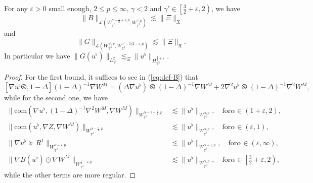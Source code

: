 \begin{lem}
  For any $\varepsilon > 0$ small enough, $2 \leqslant p \leqslant \infty$,
  $\gamma < 2$ and $\gamma' \in \left[ \frac{3}{2} + \varepsilon, 2 \right)$,
  we have
  \begin{equation}
    \| B \|_{\mathcal{L} (W_{\mathbb{T}^3}^{\gamma - \frac{1}{2} + \varepsilon, p},
    W_{\mathbb{T}^3}^{\gamma, p})} \lesssim \| \Xi \|_{\mathfrak{X} }
    \label{eq:bounded-B}
  \end{equation}
  and
  \begin{equation}
    \| G \|_{\mathcal{L} \left( W^{\gamma', p}_{\mathbb{T}^3} {,
    W_{\mathbb{T}^3}^{\gamma' - 3 / 2 - \varepsilon, p}}  \right)} \lesssim \|
    \Xi \|_{\mathfrak{X}} . \label{eq:bounded-G}
  \end{equation}
  In particular we have $\| G (u^{\flat}) \|_{L^2_{\mathbb{T}^3}}
  \lesssim_{\Xi} \| u^{\flat} \|_{H^{\frac{3}{2} +
  \varepsilon}_{\mathbb{T}^3}}$.
\end{lem}

\begin{proof}
  For the first bound, it suffices to see in (\ref{eq:def-B}) that
  \[ [\nabla u^{\flat} \olessthan, 1 - \Delta] (1 - \Delta)^{- 1} \nabla W^M =
     (\Delta \nabla u^{\flat}) \olessthan (1 - \Delta)^{- 1} \nabla W^M + 2
     \nabla^2 u^{\flat} \olessthan (1 - \Delta)^{- 1} \nabla^2 W^M, \]
  while for the second one, we have
  \begin{align*}
    \| \mathrm{com} (\nabla u^{\flat}, (1 - \Delta)^{- 1} \nabla^2 W^M, \nabla
    W^M) \|_{W^{\alpha - 1 - \frac{\varepsilon}{2}, p}_{\mathbb{T}^3}} &
    \lesssim \| u^{\flat} \|_{W^{\alpha, p}_{\mathbb{T}^3}}, \quad
    \mathrm{for } \alpha \in (1 + \varepsilon, 2),\\
    \| \mathrm{com} (u^{\flat}, \nabla Z, \nabla W^M) \|_{W^{\alpha -
    \frac{\varepsilon}{2}, p}_{\mathbb{T}^3}} & \lesssim \| u^{\flat}
    \|_{W^{\alpha, p}_{\mathbb{T}^3}}, \quad \mathrm{for } \alpha \in
    (\varepsilon, 1),\\
    \| \nabla u^{\flat} \succcurlyeq R^1 \|_{W^{\alpha - \varepsilon,
    p}_{\mathbb{T}^3}} & \lesssim \| u^{\flat} \|_{W^{\alpha + 1,
    p}_{\mathbb{T}^3}}, \quad \mathrm{for } \alpha \in (\varepsilon, \infty),\\
    \| \nabla B (u^{\flat}) \odot \nabla W^M \|_{W^{\frac{1}{2} - \varepsilon,
    p}_{\mathbb{T}^3}} & \lesssim \| u^{\flat} \|_{W^{\alpha,
    p}_{\mathbb{T}^3}}, \quad \mathrm{for } \alpha \in \left[ \frac{3}{2} +
    \varepsilon, 2 \right),
  \end{align*}
  while the other terms are more regular.
\end{proof}

